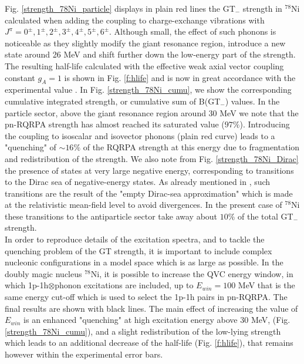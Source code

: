 \documentclass{PoS}
\begin{document}
\noindent Fig. \ref{strength_78Ni_particle} displays in plain red lines the GT$_-$ strength in $^{78}$Ni calculated when adding the coupling to charge-exchange vibrations with $J^\pi=0^\pm,1^\pm,2^\pm,3^\pm,4^\pm,5^\pm,6^\pm$. 
Although small, the effect of such phonons is noticeable as they slightly modify the giant resonance region, introduce a new state around 26 MeV and shift further down the low-energy part of the strength. The resulting half-life calculated with the effective weak axial vector coupling constant $g_A =1$ is shown in Fig. \ref{f:hlife} and is now in great accordance with the experimental value \cite{Hosmer}. 
In Fig. \ref{strength_78Ni_cumu}, we show the corresponding cumulative integrated strength, or cumulative sum of B(GT$_-$) values. In the particle sector, above the giant resonance region around 30 MeV we note that the pn-RQRPA strength has almost reached its saturated value ($97\%$). Introducing the coupling to isoscalar and isovector phonons (plain red curve) leads to a "quenching" of $\sim 16\%$ of the RQRPA strength at this energy due to fragmentation and redistribution of the strength.
We also note from Fig. \ref{strength_78Ni_Dirac} the presence of states at very large negative energy, corresponding to transitions to the Dirac sea of negative-energy states. As already mentioned in \cite{Paar}, such transitions are the result of the "empty Dirac-sea approximation" which is made at the relativistic mean-field level to avoid divergences. In the present case of $^{78}$Ni these transitions to the antiparticle sector take away about $10\%$ of the total GT$_-$ strength.
\\
In order to reproduce details of the excitation spectra, and to tackle the quenching problem of the GT strength, it is important to include complex nucleonic configurations in a model space which is as large as possible.
In the doubly magic nucleus $^{78}$Ni, it is possible to increase the QVC energy window, in which 1p-1h$\otimes$phonon excitations are included, up to $E_{win} = 100$ MeV that is the same energy cut-off which is used to select the 1p-1h pairs in pn-RQRPA. The final results are shown with black lines. The main effect of increasing the value of $E_{win}$ is an enhanced "quenching" at high excitation energy above 30 MeV, (Fig. \ref{strength_78Ni_cumu}), and a slight redistribution of the low-lying strength which leads to an additional decrease of the half-life (Fig. \ref{f:hlife}), that remains however within the experimental error bars. 
%
\end{document}
